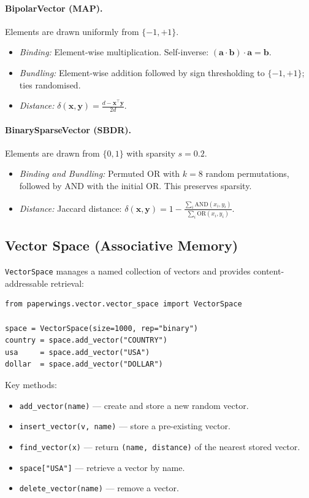 \documentclass[11pt]{article}
\begin{document}
\paragraph{BipolarVector (MAP).} Elements are drawn uniformly from $\{-1, +1\}$.
\begin{itemize}
    \item \textit{Binding:} Element-wise multiplication. Self-inverse: $(\mathbf{a} \cdot \mathbf{b}) \cdot \mathbf{a} = \mathbf{b}$.
    \item \textit{Bundling:} Element-wise addition followed by sign thresholding to $\{-1, +1\}$; ties randomised.
    \item \textit{Distance:} $\delta(\mathbf{x}, \mathbf{y}) = \frac{d - \mathbf{x}^\top\mathbf{y}}{2d}$.
\end{itemize}

\paragraph{BinarySparseVector (SBDR).} Elements are drawn from $\{0, 1\}$ with sparsity $s = 0.2$.
\begin{itemize}
    \item \textit{Binding and Bundling:} Permuted OR with $k = 8$ random permutations, followed by AND with the initial OR. This preserves sparsity.
    \item \textit{Distance:} Jaccard distance: $\delta(\mathbf{x}, \mathbf{y}) = 1 - \frac{\sum_i \text{AND}(x_i, y_i)}{\sum_i \text{OR}(x_i, y_i)}$.
\end{itemize}

\subsection{Vector Space (Associative Memory)}

\texttt{VectorSpace} manages a named collection of vectors and provides content-addressable retrieval:

\begin{lstlisting}
from paperwings.vector.vector_space import VectorSpace

space = VectorSpace(size=1000, rep="binary")
country = space.add_vector("COUNTRY")
usa     = space.add_vector("USA")
dollar  = space.add_vector("DOLLAR")
\end{lstlisting}

Key methods:
\begin{itemize}
    \item \texttt{add\_vector(name)} --- create and store a new random vector.
    \item \texttt{insert\_vector(v, name)} --- store a pre-existing vector.
    \item \texttt{find\_vector(x)} --- return \texttt{(name, distance)} of the nearest stored vector.
    \item \texttt{space["USA"]} --- retrieve a vector by name.
    \item \texttt{delete\_vector(name)} --- remove a vector.
\end{itemize}
\end{document}
